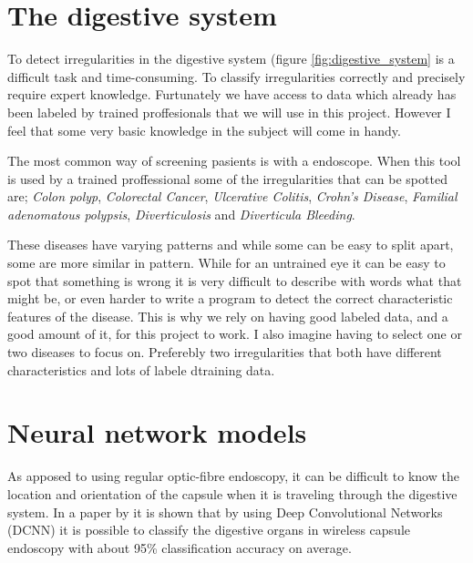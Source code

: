 \documentclass[english, a4paper]{report}
\begin{document}
\section{The digestive system}

To detect irregularities in the digestive system (figure \ref{fig:digestive_system} is a difficult task and time-consuming. To classify irregularities correctly and precisely require expert knowledge. Furtunately we have access to data which already has been labeled by trained proffesionals that we will use in this project. However I feel that some very basic knowledge in the subject will come in handy.

The most common way of screening pasients is with a endoscope. When this tool is used by a trained proffessional some of the irregularities that can be spotted are; \textit{Colon polyp}, \textit{Colorectal Cancer}, \textit{Ulcerative Colitis}, \textit{Crohn's Disease}, \textit{Familial adenomatous polypsis}, \textit{Diverticulosis} and \textit{Diverticula Bleeding}. 

These diseases have varying patterns and while some can be easy to split apart, some are more similar in pattern. While for an untrained eye it can be easy to spot that something is wrong it is very difficult to describe with words what that might be, or even harder to write a program to detect the correct characteristic features of the disease. This is why we rely on having good labeled data, and a good amount of it, for this project to work. I also imagine having to select one or two diseases to focus on. Preferebly two irregularities that both have different characteristics and lots of labele dtraining data.



\section{Neural network models}
As apposed to using regular optic-fibre endoscopy, it can be difficult to know the location and orientation of the capsule when it is traveling through the digestive system. In a paper by \citeauthor*{ClassifyingDigestive15} \cite{ClassifyingDigestive15} it is shown that by using Deep Convolutional Networks (DCNN) it is possible to classify the digestive organs in wireless capsule endoscopy with about 95\% classification accuracy on average. 
\end{document}
